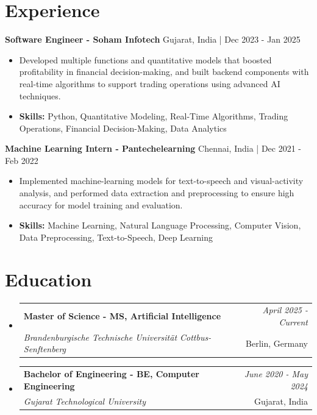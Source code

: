 \documentclass[a4paper,11pt]{article}
\makeatletter
\newcommand{\resumeSubheading}[4]{
\vspace{0.5mm}\item
    \begin{tabular*}{0.98\textwidth}[t]{l@{\extracolsep{\fill}}r}
        \textbf{#1} & \textit{\footnotesize{#4}} \\
        \textit{\footnotesize{#3}} &  \footnotesize{#2}\\
    \end{tabular*}
    \vspace{-2.4mm}
}
\makeatother
\begin{document}
\section{\textbf{Experience}}


\vspace{1mm}
  \textbf{Software Engineer - Soham Infotech} \hfill Gujarat, India | Dec 2023 - Jan 2025
\vspace{-1.5mm} %
\begin{itemize}
  \item Developed multiple functions and quantitative models that boosted profitability in financial decision-making, and built backend components with real-time algorithms to support trading operations using advanced AI techniques.

\vspace{-2mm}
  \item \textbf{Skills:} Python, Quantitative Modeling, Real-Time Algorithms, Trading Operations, Financial Decision-Making, Data Analytics
\end{itemize}

\vspace{1mm}
  \textbf{Machine Learning Intern - Pantechelearning} \hfill Chennai, India | Dec 2021 - Feb 2022
\vspace{-1.5mm} %
\begin{itemize}
  \item Implemented machine-learning models for text-to-speech and visual-activity analysis, and performed data extraction and preprocessing to ensure high accuracy for model training and evaluation.
\vspace{-2mm}
  \item \textbf{Skills:} Machine Learning, Natural Language Processing, Computer Vision, Data Preprocessing, Text-to-Speech, Deep Learning
\end{itemize}\section{\textbf{Education}}
\vspace{-0.4mm}

\begin{itemize}
\resumeSubheading
{Master of Science - MS, Artificial Intelligence }{Berlin, Germany}
{Brandenburgische Technische Universität Cottbus-Senftenberg  }{April 2025 - Current}

\vspace{1.0mm} %
\resumeSubheading
{Bachelor of Engineering - BE, Computer Engineering  }{Gujarat, India}
{Gujarat Technological University }{June 2020 - May 2024}

\end{itemize}
\end{document}
